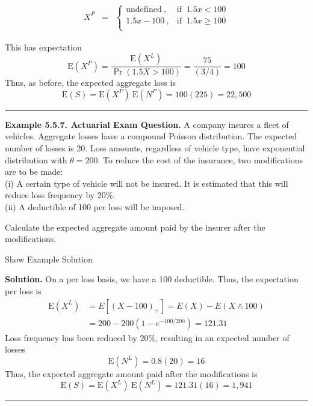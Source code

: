 \documentclass[]{book}
\theoremstyle{definition}
\theoremstyle{definition}
\theoremstyle{definition}
\theoremstyle{remark}
\begin{document}
\begin{eqnarray*}
X^P &=&
\left\{
\begin{array}{ll}
\text{undefined}~, & \text{if }~ 1.5x<100 \\
1.5x-100~, & \text{if } ~ 1.5x\ge 100\\
\end{array}
\right.
\end{eqnarray*}

This has expectation
\[\mathrm{E}(X^P)=\frac{\mathrm{E}(X^L)}{\Pr(1.5X > 100)}=\frac{75}{(3/4)}=100\]
Thus, as before, the expected aggregate loss is
\[\mathrm{E}(S)=\mathrm{E}(X^P) ~ \mathrm{E}(N^P) =
100(225)=22,500\]

\begin{center}\rule{0.5\linewidth}{\linethickness}\end{center}

\textbf{Example 5.5.7. Actuarial Exam Question.} A company insures a
fleet of vehicles. Aggregate losses have a compound Poisson
distribution. The expected number of losses is 20. Loss amounts,
regardless of vehicle type, have exponential distribution with
\(\theta=200\). To reduce the cost of the insurance, two modifications
are to be made:\\
(i) A certain type of vehicle will not be insured. It is estimated that
this will reduce loss frequency by 20\(\%\).\\
(ii) A deductible of 100 per loss will be imposed.

Calculate the expected aggregate amount paid by the insurer after the
modifications.

Show Example Solution

\hypertarget{toggleExampleAggLoss.5.7}{}
\textbf{Solution.} On a per loss basis, we have a 100 deductible. Thus,
the expectation per loss is \[\begin{aligned}
\mathrm{E}( X^L) &= E[(X-100)_+] = E(X) - E(X\wedge 100) \\
&= 200 - 200(1-e^{-100/200}) = 121.31
\end{aligned}\] Loss frequency has been reduced by 20\(\%\), resulting
in an expected number of losses \[\mathrm{E}(N^L) = 0.8(20) = 16\] Thus,
the expected aggregate amount paid after the modifications is
\[\mathrm{E}(S) = \mathrm{E}(X^L)~ \mathrm{E} (N^L) = 121.31(16) = 1,941\]

\begin{center}\rule{0.5\linewidth}{\linethickness}\end{center}
\end{document}
